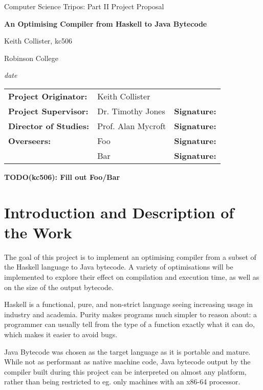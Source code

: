 \documentclass[12pt]{article}
\newcommand\todo[1]{\textbf{TODO(kc506): #1}}
\begin{document}
\thispagestyle{empty}

\centerline{\large Computer Science Tripos: Part II Project Proposal}
\vspace{0.4in}
\centerline{\Large\bf An Optimising Compiler from Haskell to Java Bytecode}
\vspace{0.3in}

\centerline{Keith Collister, kc506}
\centerline{Robinson College}

\centerline{\large \emph{date}}

\vspace{1in}

\begin{tabular}{ p{4cm} p{4.5cm} l }
{\bf Project Originator:} & Keith Collister & \\[3mm]
{\bf Project Supervisor:} & Dr. Timothy Jones & {\bf Signature:} \\[3mm]
{\bf Director of Studies:} & Prof. Alan Mycroft & {\bf Signature:} \\[3mm]
{\bf Overseers:} & Foo & {\bf Signature:} \\[3mm]
                 & Bar & {\bf Signature:} \\[3mm]
\end{tabular}

\todo{Fill out Foo/Bar}

\vspace{0.75in}



\section*{Introduction and Description of the Work}

The goal of this project is to implement an optimising compiler from a subset of the Haskell language to Java bytecode.
A variety of optimisations will be implemented to explore their effect on compilation and execution time, as well as on
the size of the output bytecode.

Haskell is a functional, pure, and non-strict language seeing increasing usage in industry and academia. Purity makes
programs much simpler to reason about: a programmer can usually tell from the type of a function exactly what it can do,
which makes it easier to avoid bugs.

Java Bytecode was chosen as the target language as it is portable and mature. While not as performant as native machine
code, Java bytecode output by the compiler built during this project can be interpreted on almost any platform, rather
than being restricted to eg. only machines with an x86-64 processor.
\end{document}
